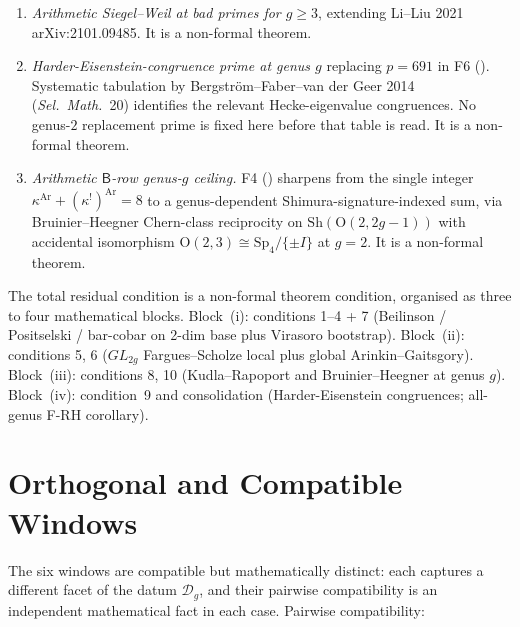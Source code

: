 \begin{enumerate}
It is a non-formal theorem.
\item \emph{Arithmetic Siegel--Weil at bad primes for \(g\geq 3\)},
extending Li--Liu 2021 arXiv:2101.09485. It is a non-formal theorem.
\item \emph{Harder-Eisenstein-congruence prime at genus \(g\)} replacing
\(p=691\) in F6 ().
Systematic tabulation by Bergstr\"om--Faber--van der Geer 2014
(\emph{Sel.~Math.}~20) identifies the relevant Hecke-eigenvalue congruences.
No genus-\(2\) replacement prime is fixed here before that table is
read.
It is a non-formal theorem.
\item \emph{Arithmetic \(\mathsf{B}\)-row genus-\(g\) ceiling.} F4
() sharpens from the single integer
\(\kappa^{\mathrm{Ar}}+(\kappa^{!})^{\mathrm{Ar}}=8\) to a
genus-dependent Shimura-signature-indexed sum, via Bruinier--Heegner
Chern-class reciprocity on \(\mathrm{Sh}(\mathrm{O}(2,2g-1))\) with
accidental isomorphism \(\mathrm{O}(2,3)\cong\mathrm{Sp}_4/\{\pm I\}\)
at \(g=2\). It is a non-formal theorem.
\end{enumerate}

The total residual condition is a non-formal theorem condition, organised as
three to four mathematical blocks. Block~(i): conditions 1--4 + 7
(Beilinson / Positselski / bar-cobar on 2-dim base plus Virasoro
bootstrap). Block~(ii): conditions 5, 6 (\(GL_{2g}\) Fargues--Scholze
local plus global Arinkin--Gaitsgory). Block~(iii): conditions 8, 10
(Kudla--Rapoport and Bruinier--Heegner at genus \(g\)). Block~(iv):
condition~9 and consolidation (Harder-Eisenstein congruences; all-genus
F-RH corollary).

\section{Orthogonal and Compatible Windows}
\label{v4-arith:ag:orthogonal}

The six windows are compatible but mathematically distinct: each
captures a different facet of the datum \(\mathcal{D}_g\), and their
pairwise compatibility is an independent mathematical fact in each case.
Pairwise compatibility:


